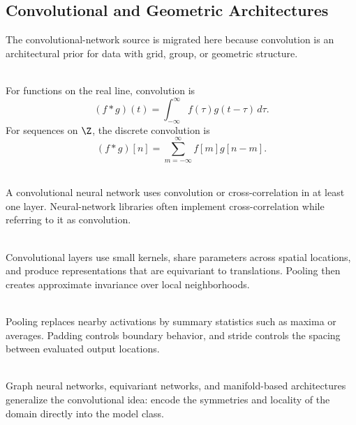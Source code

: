 \subsection{Convolutional and Geometric Architectures}

The convolutional-network source is migrated here because convolution is an architectural prior for data with grid, group, or geometric structure.

\begin{definition} \label{def:sl-convolution} \\
For functions on the real line, convolution is
\[
(f*g)(t)=\int_{-\infty}^{\infty}f(\tau)g(t-\tau)\,d\tau.
\]
For sequences on $\Z$, the discrete convolution is
\[
(f*g)[n]=\sum_{m=-\infty}^{\infty}f[m]g[n-m].
\]
\end{definition}

\begin{definition} \label{def:sl-convolutional-neural-network} \\
A convolutional neural network uses convolution or cross-correlation in at least one layer.  Neural-network libraries often implement cross-correlation while referring to it as convolution.
\end{definition}

\begin{remark} \label{rem:sl-cnn-motivations} \\
Convolutional layers use small kernels, share parameters across spatial locations, and produce representations that are equivariant to translations.  Pooling then creates approximate invariance over local neighborhoods.
\end{remark}

\begin{definition} \label{def:sl-pooling-padding-stride} \\
Pooling replaces nearby activations by summary statistics such as maxima or averages.  Padding controls boundary behavior, and stride controls the spacing between evaluated output locations.
\end{definition}

\begin{remark} \label{rem:sl-geometric-deep-learning} \\
Graph neural networks, equivariant networks, and manifold-based architectures generalize the convolutional idea: encode the symmetries and locality of the domain directly into the model class.
\end{remark}
